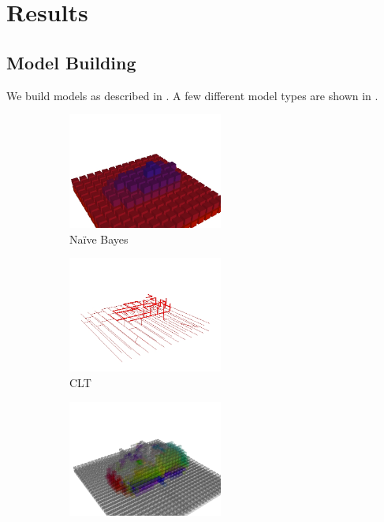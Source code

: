\section{Results}\label{sec:results}

\subsection{Model Building}

We build models as described in . A few different model
types are shown in .

\begin{figure}
  \centering
  \begin{subfigure}[]{0.3\linewidth}
    \centering
    \includegraphics[height=1.5in]{figures/car_marginal.jpg}
    \caption{Na\"ive Bayes}
    \label{fig:nb}
  \end{subfigure}
  \begin{subfigure}[]{0.3\linewidth}
    \centering
    \includegraphics[height=1.5in]{figures/car_tree.jpg}
    \caption{\ac{CLT}}
    \label{fig:clt}
  \end{subfigure}
  \begin{subfigure}[]{0.3\linewidth}
    \centering
    \includegraphics[height=1.5in]{figures/car_fm.jpg}

\end{subfigure}
\end{figure}
